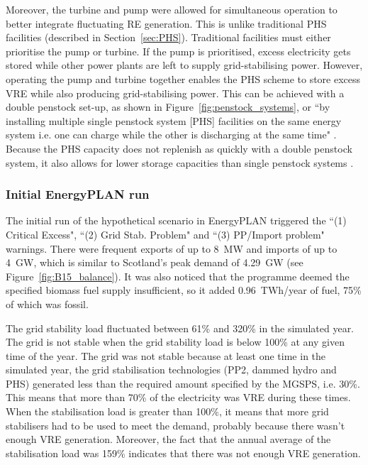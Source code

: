 Moreover, the turbine and pump were allowed for simultaneous operation to better integrate fluctuating RE generation.
This is unlike traditional PHS facilities (described in Section~\ref{sec:PHS}).
Traditional facilities must either prioritise the pump or turbine.
If the pump is prioritised, excess electricity gets stored while other power plants are left to supply grid-stabilising power.
However, operating the pump and turbine together enables the PHS scheme to store excess VRE while also producing grid-stabilising power.
This can be achieved with a double penstock set-up, as shown in Figure~\ref{fig:penstock_systems}, or ``by installing multiple single penstock system [PHS] facilities on the same energy system i.e. one can charge while the other is discharging at the same time" \citep[p.~39]{Connolly2015}.
Because the PHS capacity does not replenish as quickly with a double penstock system, it also allows for lower storage capacities than single penstock systems \citep{Connolly2015}.













\subsubsection{Initial EnergyPLAN run}

The initial run of the hypothetical scenario in EnergyPLAN triggered the ``(1) Critical Excess", ``(2) Grid Stab. Problem" and ``(3) PP/Import problem" warnings.
There were frequent exports of up to 8~MW and imports of up to 4~GW, which is similar to Scotland's peak demand of 4.29~GW (see Figure~\ref{fig:B15_balance}).
It was also noticed that the programme deemed the specified biomass fuel supply insufficient, so it added 0.96~TWh/year of fuel, 75\% of which was fossil.

The grid stability load fluctuated between 61\% and 320\% in the simulated year.
The grid is not stable when the grid stability load is below 100\% at any given time of the year.
The grid was not stable because at least one time in the simulated year, the grid stabilisation technologies (PP2, dammed hydro and PHS) generated less than the required amount specified by the MGSPS, i.e. 30\%.
This means that more than 70\% of the electricity was VRE during these times.
When the stabilisation load is greater than 100\%, it means that more grid stabilisers had to be used to meet the demand, probably because there wasn't enough VRE generation.
Moreover, the fact that the annual average of the stabilisation load was 159\% indicates that there was not enough VRE generation.



